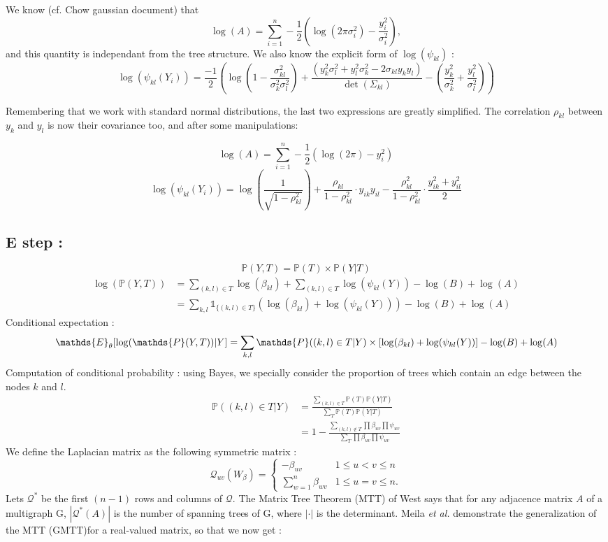 \documentclass[a4paper,10pt]{article}
\begin{document}
We know (cf. Chow gaussian document) that 
\[\log(A) = \sum_{i=1}^n-\frac{1}{2}\left(\log(2\pi\sigma_i^2)-\frac{y_i^2}{\sigma_i^2}\right),\]
and this quantity is independant from the tree structure. We also know the explicit form of $\log(\psi_{kl})$ :
\[\log(\psi_{kl}(Y_i))=\frac{-1}{2}\left(\log\left(1-\frac{\sigma_{kl}^2}{\sigma_k^2 \sigma_{l}^2}\right)+\frac{(y_k^2\sigma_{l}^2+y_{l}^2\sigma_k^2-2\sigma_{kl}y_ky_{l})}
{\det(\Sigma_{kl})}-\left(\frac{y_k^2}{\sigma_k^2}+\frac{y_{l}^2}{\sigma_{l}^2}\right)\right)\]

Remembering that we work with standard normal distributions, the last two expressions are greatly simplified. The correlation $\rho_{kl}$ 
between $y_k$ and $y_l$ is now their covariance too, and after some manipulations:

\[\log(A) = \sum_{i=1}^n-\frac{1}{2}\left(\log(2\pi)-y_i^2\right)\]
\[\log(\psi_{kl}(Y_i))=\log\left(\frac{1}{\sqrt{1-\rho_{kl}^2}}\right)+\frac{\rho_{kl}}{1-\rho_{kl}^2}\cdot y_{ik}y_{il} - 
\frac{\rho_{kl}^2}{1-\rho_{kl}^2}\cdot \frac{y_{ik}^2 + y_{il}^2}{2}\]

\subsection{E step :}
\[ \mathds{P}(Y,T) = \mathds{P}(T)\times\mathds{P}(Y|T)\]
\begin{align*}
 \log(\mathds{P}(Y,T)) &= \sum_{(k,l)\in T} \log(\beta_{kl})  + \sum_{(k,l)\in T} \log(\psi_{kl}(Y))- \log (B)+\log(A)\\
 &=\sum_{k,l} \mathds{1}_{\{(k,l) \in T\}} \left(\log(\beta_{kl})  +  \log(\psi_{kl}(Y))\right)- \log (B)+\log(A)
\end{align*}
 Conditional expectation :
\[ \mathds{E}_\theta[\log(\mathds{P}(Y,T))|Y] \\
= \sum_{k,l}  \mathds{P}((k,l)\in T | Y) \times \left[ \log(\beta_{kl}) + \log(\psi_{kl}(Y)) \right]
 -\log(B)+\log(A)\]
 Computation of conditional probability : using Bayes, we specially consider the proportion of trees which contain an edge between the nodes $k$ and $l$.
 \begin{align*}
 \mathds{P}((k,l)\in T | Y)  &= \frac{\sum_{(k,l)\in T} \mathds{P}(T)\mathds{P}(Y|T)}{\sum_{T} \mathds{P}(T)\mathds{P}(Y|T)}\\
 &=1-\frac{\sum_{(k,l)\notin T} \prod \beta_{uv} \prod \psi_{uv}}{\sum_{T} \prod \beta_{uv} \prod \psi_{uv}}
 \end{align*}
 We define the Laplacian matrix as the following symmetric matrix :
 \[\mathcal{Q}_{uv}(W_\beta)=\begin{cases}
               -\beta_{uv} & 1\leq u<v \leq n\\
               \sum_{w=1}^n \beta_{wv} & 1\leq u=v \leq n.
            \end{cases}\]
 Lets $\mathcal{Q}^*$ be the first $(n-1)$ rows and columns of $\mathcal{Q}$. The  Matrix Tree Theorem (MTT) of West \cite{west} says that
 for any adjacence matrix $A$ of a multigraph G, $|\mathcal{Q}^*(A)|$ is the number of spanning trees of G, where $|\cdot|$ is the determinant.
 Meila \textit{et al.} \cite{meila} demonstrate the generalization of the MTT (GMTT)for a real-valued matrix, so that we now  get :
\end{document}
